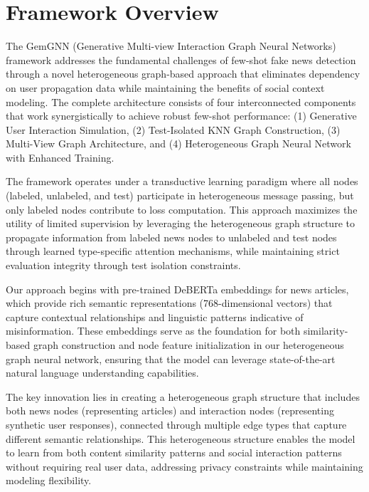 
\section{Framework Overview}

The GemGNN (Generative Multi-view Interaction Graph Neural Networks) framework addresses the fundamental challenges of few-shot fake news detection through a novel heterogeneous graph-based approach that eliminates dependency on user propagation data while maintaining the benefits of social context modeling. The complete architecture consists of four interconnected components that work synergistically to achieve robust few-shot performance: (1) Generative User Interaction Simulation, (2) Test-Isolated KNN Graph Construction, (3) Multi-View Graph Architecture, and (4) Heterogeneous Graph Neural Network with Enhanced Training.


The framework operates under a transductive learning paradigm where all nodes (labeled, unlabeled, and test) participate in heterogeneous message passing, but only labeled nodes contribute to loss computation. This approach maximizes the utility of limited supervision by leveraging the heterogeneous graph structure to propagate information from labeled news nodes to unlabeled and test nodes through learned type-specific attention mechanisms, while maintaining strict evaluation integrity through test isolation constraints.


Our approach begins with pre-trained DeBERTa embeddings for news articles, which provide rich semantic representations (768-dimensional vectors) that capture contextual relationships and linguistic patterns indicative of misinformation. These embeddings serve as the foundation for both similarity-based graph construction and node feature initialization in our heterogeneous graph neural network, ensuring that the model can leverage state-of-the-art natural language understanding capabilities.

The key innovation lies in creating a heterogeneous graph structure that includes both news nodes (representing articles) and interaction nodes (representing synthetic user responses), connected through multiple edge types that capture different semantic relationships. This heterogeneous structure enables the model to learn from both content similarity patterns and social interaction patterns without requiring real user data, addressing privacy constraints while maintaining modeling flexibility.

